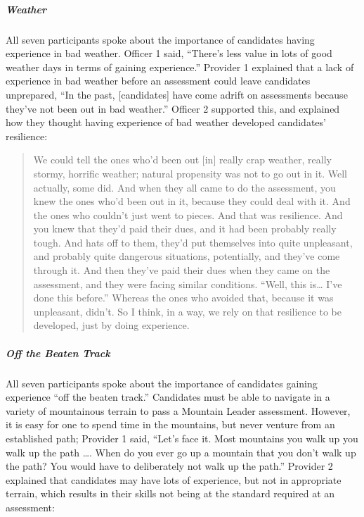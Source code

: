 \documentclass[
  12pt,
  a4paper,
]{book}
\begin{document}
\hypertarget{weather}{%
\subparagraph{Weather}\label{weather}}

All seven participants spoke about the importance of candidates having experience in bad weather. Officer 1 said, ``There's less value in lots of good weather days in terms of gaining experience.'' Provider 1 explained that a lack of experience in bad weather before an assessment could leave candidates unprepared, ``In the past, {[}candidates{]} have come adrift on assessments because they've not been out in bad weather.'' Officer 2 supported this, and explained how they thought having experience of bad weather developed candidates' resilience:

\begin{quote}
We could tell the ones who'd been out {[}in{]} really crap weather, really stormy, horrific weather; natural propensity was not to go out in it. Well actually, some did. And when they all came to do the assessment, you knew the ones who'd been out in it, because they could deal with it. And the ones who couldn't just went to pieces. And that was resilience. And you knew that they'd paid their dues, and it had been probably really tough. And hats off to them, they'd put themselves into quite unpleasant, and probably quite dangerous situations, potentially, and they've come through it. And then they've paid their dues when they came on the assessment, and they were facing similar conditions. ``Well, this is\ldots{} I've done this before.'' Whereas the ones who avoided that, because it was unpleasant, didn't. So I think, in a way, we rely on that resilience to be developed, just by doing experience.
\end{quote}

\hypertarget{qual-off-the-beaten-track}{%
\subparagraph{Off the Beaten Track}\label{qual-off-the-beaten-track}}

All seven participants spoke about the importance of candidates gaining experience ``off the beaten track.'' Candidates must be able to navigate in a variety of mountainous terrain to pass a Mountain Leader assessment. However, it is easy for one to spend time in the mountains, but never venture from an established path; Provider 1 said, ``Let's face it. Most mountains you walk up you walk up the path \ldots. When do you ever go up a mountain that you don't walk up the path? You would have to deliberately not walk up the path.'' Provider 2 explained that candidates may have lots of experience, but not in appropriate terrain, which results in their skills not being at the standard required at an assessment:
\end{document}
